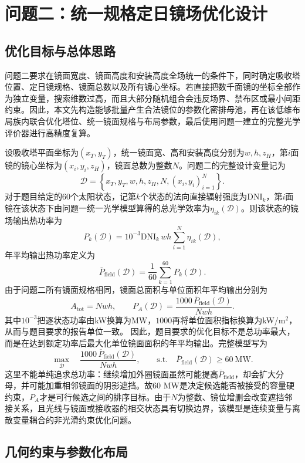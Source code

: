 \section{问题二：统一规格定日镜场优化设计}

\subsection{优化目标与总体思路}

问题二要求在镜面宽度、镜面高度和安装高度全场统一的条件下，同时确定吸收塔位置、定日镜规格、镜面总数以及所有镜心坐标。若直接把数千面镜的坐标全部作为独立变量，搜索维数过高，而且大部分随机组合会违反场界、禁布区或最小间距约束。因此，本文先构造能够批量产生合法镜位的参数化密排母池，再在该低维布局族内联合优化塔位、统一镜面规格与布局参数，最后使用问题一建立的完整光学评价器进行高精度复算。

设吸收塔平面坐标为$(x_T,y_T)$，统一镜面宽、高和安装高度分别为$w,h,z_H$，第$i$面镜的镜心坐标为$(x_i,y_i,z_H)$，镜面总数为整数$N$。问题二的完整设计变量记为
\[
 \mathcal D=\left\{x_T,y_T,w,h,z_H,N,(x_i,y_i)_{i=1}^{N}\right\}.
\]
对于题目给定的60个太阳状态，记第$k$个状态的法向直接辐射强度为$\mathrm{DNI}_k$，第$i$面镜在该状态下由问题一统一光学模型算得的总光学效率为$\eta_{ik}(\mathcal D)$。则该状态的镜场输出热功率为
\[
 P_k(\mathcal D)=10^{-3}\mathrm{DNI}_k\,wh
 \sum_{i=1}^{N}\eta_{ik}(\mathcal D),
\]
年平均输出热功率定义为
\[
 \overline P_{\mathrm{field}}(\mathcal D)
 =\frac{1}{60}\sum_{k=1}^{60}P_k(\mathcal D).
\]
由于问题二所有镜面规格相同，镜面总面积与单位面积年平均输出分别为
\[
 A_{\mathrm{tot}}=Nwh,\qquad
 P_A(\mathcal D)=\frac{1000\,\overline P_{\mathrm{field}}(\mathcal D)}{Nwh}.
\]
其中$10^{-3}$把逐状态功率由kW换算为MW，$1000$再将单位面积指标换算为kW/m$^2$，从而与题目要求的报告单位一致。
因此，题目要求的优化目标不是总功率最大，而是在达到额定功率后最大化单位镜面面积的年平均输出。完整模型写为
\[
 \max_{\mathcal D}\quad
 \frac{1000\,\overline P_{\mathrm{field}}(\mathcal D)}{Nwh},
 \qquad
 \text{s.t.}\quad
 \overline P_{\mathrm{field}}(\mathcal D)\ge 60\ \mathrm{MW}.
\]
这里不能单纯追求总功率：继续增加外圈镜面虽然可能提高$\overline P_{\mathrm{field}}$，却会扩大分母，并可能加重相邻镜面的阴影遮挡。故60 MW是决定候选能否被接受的容量硬约束，$P_A$才是可行候选之间的排序目标。由于$N$为整数、镜位增删会改变遮挡邻接关系，且光线与镜面或接收器的相交状态具有切换边界，该模型是连续变量与离散变量耦合的非光滑约束优化问题。

\subsection{几何约束与参数化布局}


